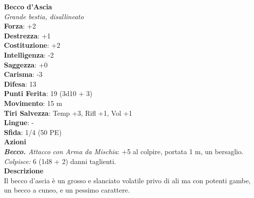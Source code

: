 \begin{multicols}{2}
\medskip\textbf{Becco d'Ascia}\\
\emph{Grande bestia, disallineato}\\
\textbf{Forza}: +2\\
\textbf{Destrezza}: +1\\
\textbf{Costituzione}: +2\\
\textbf{Intelligenza}: -2\\
\textbf{Saggezza}: +0\\
\textbf{Carisma}: -3\\
\textbf{Difesa}: 13\\
\textbf{Punti Ferita}: 19 (3d10 + 3)\\
\textbf{Movimento}: 15 m\\
\textbf{Tiri Salvezza}: Temp +3, Rifl +1, Vol +1\\
\textbf{Lingue}: -\\
\textbf{Sfida}: 1/4 (50 PE)\smallskip\\
\smallskip\textbf{Azioni}\\
\emph{\textbf{Becco.} Attacco con Arma da Mischia}: +5 al colpire, portata 1 m, un bersaglio.\\
\emph{Colpisce:} 6 (1d8 + 2) danni taglienti.\\

\textbf{Descrizione}\\
Il becco d'ascia è un grosso e slanciato volatile privo di ali ma con potenti gambe, un becco a cuneo, e un pessimo carattere.\\


\end{multicols}
